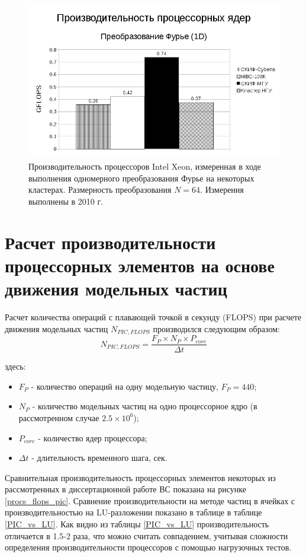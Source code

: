 \begin{figure}[htb]
	\begin{center}
		\includegraphics[height=7cm,keepaspectratio]{images/processor_FLOPS.png}
	\end{center}
	\caption{Производительность процессоров Intel Xeon, измеренная в ходе выполнения одномерного преобразования Фурье на некоторых кластерах. Размерность преобразования $N=64$. Измерения выполнены в 2010 г.}
	\label{procs_flops}
\end{figure} 


\section{Расчет производительности процессорных элементов на основе движения модельных частиц}

Расчет количества операций с плавающей точкой в секунду (FLOPS) при расчете движения модельных частиц $N_{PIC,FLOPS}$ производился следующим образом:
\begin{equation}
N_{PIC,FLOPS} = \frac{F_P\times N_P \times P_{core}}{\Delta t}
\label{PIC_FLOPS}
\end{equation}

здесь:
\begin{itemize}
	\item $F_P$ - количество операций на одну модельную частицу, $F_P = 440$;
	\item $N_P$ - количество модельных частиц на одно процессорное ядро (в рассмотренном случае $2.5\times 10^6$);  
	\item $P_{core}$ - количество ядер процессора;
	\item $\Delta t$  - длительность временного шага, сек.
\end{itemize}	


\label{calc_PE}
 Сравнительная производительность процессорных элементов некоторых из рассмотренных в диссертационной работе ВС  показана на рисунке  \ref{procs_flops_pic}.  Сравнение производительности 
 на методе частиц в ячейках с производительностью на LU-разложении показано в таблице в таблице \ref{PIC_vs_LU}. Как видно из таблицы \ref{PIC_vs_LU} производительность отличается в 1.5-2 раза, что можно считать совпадением, учитывая сложности определения производительности процессоров с помощью нагрузочных тестов. 
   
